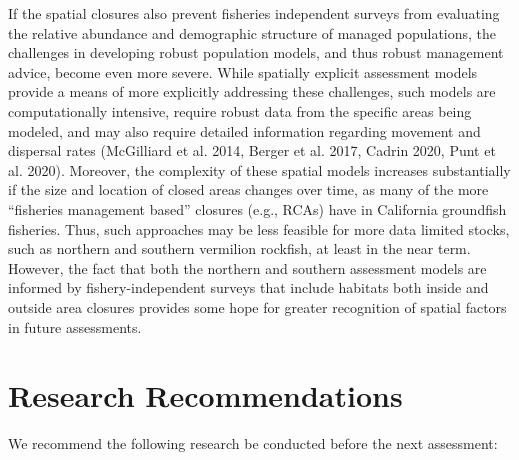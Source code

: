 \documentclass[11pt,
  english,
  a4paper,
]{article}
\begin{document}
If the spatial closures also prevent fisheries independent surveys from evaluating the relative abundance and demographic structure of managed populations, the challenges in developing robust population models, and thus robust management advice, become even more severe. While spatially explicit assessment models provide a means of more explicitly addressing these challenges, such models are computationally intensive, require robust data from the specific areas being modeled, and may also require detailed information regarding movement and dispersal rates {(McGilliard et al. 2014, Berger et al. 2017, Cadrin 2020, Punt et al. 2020)\leavevmode\tagmcend\tagstructend}. Moreover, the complexity of these spatial models increases substantially if the size and location of closed areas changes over time, as many of the more ``fisheries management based'' closures (e.g., RCAs) have in California groundfish fisheries. Thus, such approaches may be less feasible for more data limited stocks, such as northern and southern vermilion rockfish, at least in the near term. However, the fact that both the northern and southern assessment models are informed by fishery-independent surveys that include habitats both inside and outside area closures provides some hope for greater recognition of spatial factors in future assessments.


\hypertarget{research-recommendations}{%
\section{Research Recommendations}\label{research-recommendations}}

\leavevmode\tagmcend\tagstructend

We recommend the following research be conducted before the next assessment:

\end{document}
